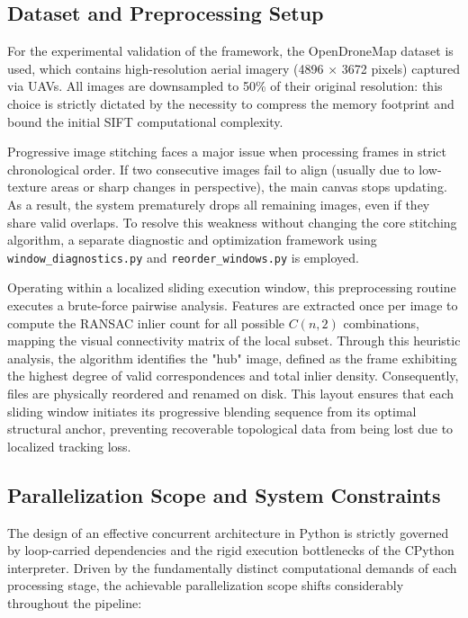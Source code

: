 \documentclass[10pt,twocolumn,letterpaper]{article}
\begin{document}
\subsection{Dataset and Preprocessing Setup}

For the experimental validation of the framework, the OpenDroneMap dataset \cite{odmAukermanDataset} is used, 
which contains high-resolution aerial imagery (4896 × 3672 pixels) captured via UAVs. 
All images are downsampled to 50\% of their original resolution: this choice is strictly dictated by the necessity to compress the memory footprint and bound the initial SIFT computational complexity.

Progressive image stitching faces a major issue when processing frames in strict chronological order. 
If two consecutive images fail to align (usually due to low-texture areas or sharp changes in perspective), the main canvas stops updating. 
As a result, the system prematurely drops all remaining images, even if they share valid overlaps. 
To resolve this weakness without changing the core stitching algorithm, 
a separate diagnostic and optimization framework using \texttt{window\_diagnostics.py} and \texttt{reorder\_windows.py} is employed.

Operating within a localized sliding execution window, 
this preprocessing routine executes a brute-force pairwise analysis. 
Features are extracted once per image to compute the RANSAC inlier count for all possible $C(n,2)$ combinations, 
mapping the visual connectivity matrix of the local subset. 
Through this heuristic analysis, the algorithm identifies the "hub" image, defined as the frame exhibiting the highest degree of valid correspondences and total inlier density.
 Consequently, files are physically reordered and renamed on disk. 
 This layout ensures that each sliding window initiates its progressive blending sequence from its optimal structural
  anchor, preventing recoverable topological data from being lost due to localized tracking loss.

\subsection{Parallelization Scope and System Constraints}
The design of an effective concurrent architecture in Python is strictly governed by loop-carried dependencies and the rigid execution bottlenecks of the CPython interpreter. 
Driven by the fundamentally distinct computational demands of each processing stage, 
the achievable parallelization scope shifts considerably throughout the pipeline:
\end{document}
